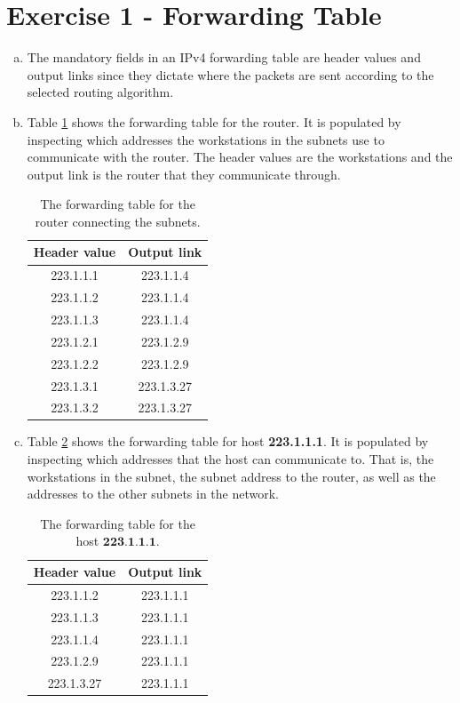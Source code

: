 \documentclass[10pt]{article}
\begin{document}
\section{Exercise 1 - Forwarding Table}
\begin{enumerate}[(a)]
  \item The mandatory fields in an IPv4 forwarding table are header values and output links since they dictate where the packets are sent according to the selected routing algorithm.
  \item Table \ref{table:router} shows the forwarding table for the router. It is populated by inspecting which addresses the workstations in the subnets use to communicate with the router. The header values are the workstations and the output link is the router that they communicate through.
  \begin{table}[H]
    \centering
    \begin{tabular}{| c | c |}
      \hline
      \textbf{Header value} & \textbf{Output link} \\ \hline
      223.1.1.1 & 223.1.1.4 \\ \hline
      223.1.1.2 & 223.1.1.4 \\ \hline
      223.1.1.3 & 223.1.1.4 \\ \hline
      223.1.2.1 & 223.1.2.9 \\ \hline
      223.1.2.2 & 223.1.2.9 \\ \hline
      223.1.3.1 & 223.1.3.27 \\ \hline
      223.1.3.2 & 223.1.3.27 \\ \hline
    \end{tabular}
    \caption{The forwarding table for the router connecting the subnets.}
    \label{table:router}
  \end{table}
  \item Table \ref{table:host} shows the forwarding table for host \textbf{223.1.1.1}. It is populated by inspecting which addresses that the host can communicate to. That is, the workstations in the subnet, the subnet address to the router, as well as the addresses to the other subnets in the network.
  \begin{table}[H]
    \centering
    \begin{tabular}{| c | c |}
      \hline
      \textbf{Header value} & \textbf{Output link} \\ \hline
      223.1.1.2 & 223.1.1.1 \\ \hline
      223.1.1.3 & 223.1.1.1 \\ \hline
      223.1.1.4 & 223.1.1.1 \\ \hline
      223.1.2.9 & 223.1.1.1 \\ \hline
      223.1.3.27 & 223.1.1.1 \\ \hline
    \end{tabular}
    \caption{The forwarding table for the host $\textbf{223.1.1.1}$.}
    \label{table:host}
  \end{table}
\end{enumerate}
\end{document}

